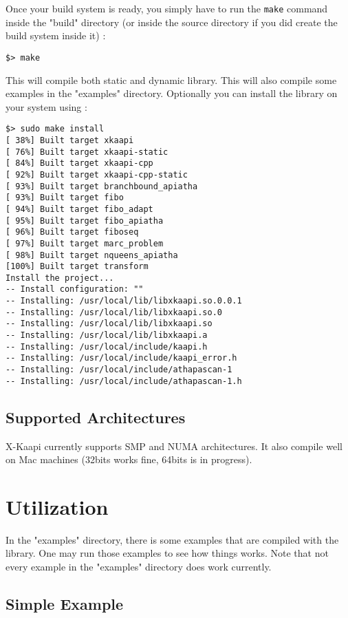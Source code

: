 \documentclass{article}
\newcommand{\kaapi}{\textsc{X}-Kaapi\xspace}
\begin{document}
Once your build system is ready, you simply have to run the \verb+make+ command inside the "build" directory (or inside the source directory if you did create the build system inside it) :

\begin{verbatim}
$> make
\end{verbatim}

This will compile both static and dynamic library. This will also compile some examples in the "examples" directory.
Optionally you can install the library on your system using :

\begin{verbatim}
$> sudo make install
[ 38%] Built target xkaapi
[ 76%] Built target xkaapi-static
[ 84%] Built target xkaapi-cpp
[ 92%] Built target xkaapi-cpp-static
[ 93%] Built target branchbound_apiatha
[ 93%] Built target fibo
[ 94%] Built target fibo_adapt
[ 95%] Built target fibo_apiatha
[ 96%] Built target fiboseq
[ 97%] Built target marc_problem
[ 98%] Built target nqueens_apiatha
[100%] Built target transform
Install the project...
-- Install configuration: ""
-- Installing: /usr/local/lib/libxkaapi.so.0.0.1
-- Installing: /usr/local/lib/libxkaapi.so.0
-- Installing: /usr/local/lib/libxkaapi.so
-- Installing: /usr/local/lib/libxkaapi.a
-- Installing: /usr/local/include/kaapi.h
-- Installing: /usr/local/include/kaapi_error.h
-- Installing: /usr/local/include/athapascan-1
-- Installing: /usr/local/include/athapascan-1.h
\end{verbatim}

\subsection{Supported Architectures}

\kaapi currently supports SMP and NUMA architectures. It also compile well on Mac machines (32bits works fine, 64bits is in progress).

\section{Utilization}

In the "examples" directory, there is some examples that are compiled with the library. One may run those examples to see how things works.
Note that not every example in the "examples" directory does work currently.

\subsection{Simple Example}
\end{document}
